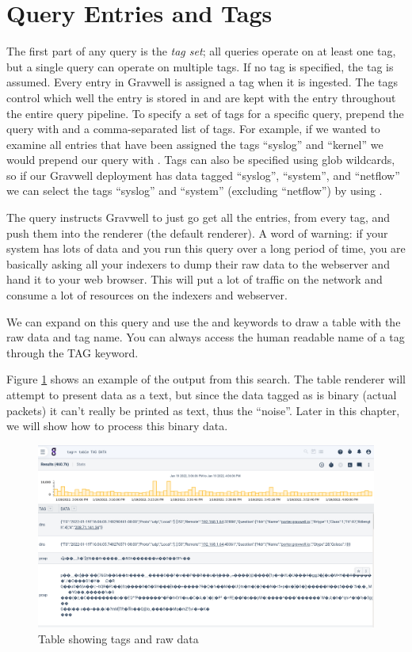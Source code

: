 \section{Query Entries and Tags}
The first part of any query is the \emph{tag set}; all queries operate on at
least one tag, but a single query can operate on multiple tags. If no
tag is specified, the  tag is assumed. Every entry in
Gravwell is assigned a tag when it is ingested. The tags control which
well the entry is stored in and are kept with the entry throughout the
entire query pipeline. To specify a set of tags for a specific query,
prepend the query with  and a comma-separated list of tags. For
example, if we wanted to examine all entries that have been assigned the
tags ``syslog'' and ``kernel'' we would prepend our query with
. Tags can also be specified using glob wildcards,
so if our Gravwell deployment has data tagged ``syslog'', ``system'', and
``netflow'' we can select the tags ``syslog'' and ``system'' (excluding ``netflow'') by using
. 

The query  instructs Gravwell to just go get all the entries,
from every tag, and push them into the  renderer (the default renderer).
A word of warning: if your system
has lots of data and you run this query over a long period of time, you are
basically asking all your indexers to dump their raw data to the
webserver and hand it to your web browser. This will put a lot of traffic on
the network and consume a lot of resources on the indexers and webserver.

We can expand on this query and use the  and  keywords to draw a
table with the raw data and tag name. You can always access the human
readable name of a tag through the TAG keyword.


Figure \ref{fig:tag-data-table} shows an example of the output from this search. The table renderer will attempt to present data as a text, but since
the data tagged as  is binary (actual packets) it can't really
be printed as text, thus the ``noise''. Later in this chapter, we will show how to
process this binary data.

\begin{figure}
	\includegraphics{images/table-tag-data.png}
	\caption{Table showing tags and raw data}
	\label{fig:tag-data-table}
\end{figure}


